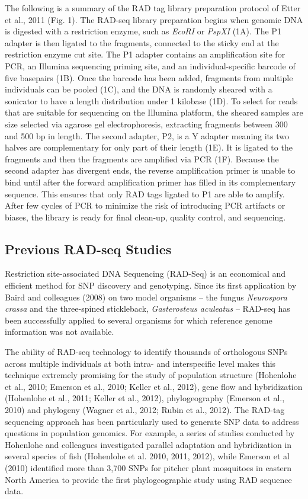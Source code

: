 \documentclass[12pt]{article}
\begin{document}
The following is a summary of the RAD tag library preparation protocol of Etter et al., 2011 (Fig. 1). The RAD-seq library preparation begins when genomic DNA is digested with a restriction enzyme, such as \emph{EcoRI} or \emph{PspXI} (1A). The P1 adapter is then ligated to the fragments, connected to the sticky end at the restriction enzyme cut site. The P1 adapter contains an amplification site for PCR, an Illumina sequencing priming site, and an individual-specific barcode of five basepairs (1B). Once the barcode has been added, fragments from multiple individuals can be pooled (1C), and the DNA is randomly sheared with a sonicator to have a length distribution under 1 kilobase (1D). To select for reads that are suitable for sequencing on the Illumina platform, the sheared samples are size selected via agarose gel electrophoresis, extracting fragments between 300 and 500 bp in length. The second adapter, P2, is a Y adapter meaning its two halves are complementary for only part of their length (1E). It is ligated to the fragments and then the fragments are amplified via PCR (1F). Because the second adapter has divergent ends, the reverse amplification primer is unable to bind until after the forward amplification primer has filled in its complementary sequence. This ensures that only RAD tags ligated to P1 are able to amplify. After few cycles of PCR to minimize the risk of introducing PCR artifacts or biases, the library is ready for final clean-up, quality control, and sequencing.

\subsection{Previous RAD-seq Studies}

Restriction site-associated DNA Sequencing (RAD-Seq) is an economical and efficient method for SNP discovery and genotyping. Since its first application by Baird and colleagues (2008) on two model organisms – the fungus \emph{Neurospora crassa} and the three-spined stickleback, \emph{Gasterosteus aculeatus} – RAD-seq has been successfully applied to several organisms for which reference genome information was not available. 

The ability of RAD-seq technology to identify thousands of orthologous SNPs across multiple individuals at both intra- and interspecific level makes this technique extremely promising for the study of population structure (Hohenlohe et al., 2010; Emerson et al., 2010; Keller et al., 2012), gene flow and hybridization (Hohenlohe et al., 2011; Keller et al., 2012), phylogeography (Emerson et al., 2010) and phylogeny (Wagner et al., 2012; Rubin et al., 2012). The RAD-tag sequencing approach has been particularly used to generate SNP data to address questions in population genomics. For example, a series of studies conducted by Hohenlohe and colleagues investigated parallel adaptation and hybridization in several species of fish (Hohenlohe et al. 2010, 2011, 2012), while Emerson et al (2010) identified more than 3,700 SNPs for pitcher plant mosquitoes in eastern North America to provide the first phylogeographic study using RAD sequence data. 
\end{document}
